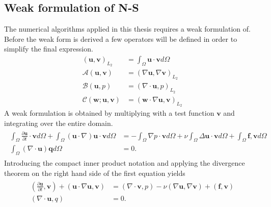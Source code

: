 \subsection{Weak formulation of N-S}
The numerical algorithms applied in this thesis requires a weak formulation of.
Before the weak form is derived a few operators will be defined in order to simplify the final 
expression.
%
\begin{align}
    ( \mathbf{u},\mathbf{v})_{L_2} &= \int_{\Omega}\mathbf{u} \cdot \mathbf{v} d\Omega\\
    \mathcal{A}(\mathbf{u},\mathbf{v}) &= (\nabla \mathbf{u},\nabla \mathbf{v})_{L_2}\\
    \mathcal{B}(\mathbf{u},p) &= (\nabla \cdot \mathbf{u},p)_{L_2}\\
    \mathcal{C}(\mathbf{w};\mathbf{u},\mathbf{v}) &= (\mathbf{w}\cdot \nabla \mathbf{u},\mathbf{v})_{L_2}
    \label{eq:weakoperators}
\end{align}
%
A weak formulation is obtained by multiplying with a test function $\mathbf{v}$ and integrating over
the entire domain.
\begin{align}
    \begin{split}
        \int_{\Omega}\frac{\partial \mathbf{u}}{\partial t}\cdot\mathbf{v}d\Omega
        + \int_{\Omega}(\mathbf{u}\cdot \nabla)\mathbf{u}\cdot\mathbf{v}d\Omega
        &= -\int_{\Omega}\nabla p\cdot \mathbf{v} d\Omega 
        + \nu \int_{\Omega}\Delta\mathbf{u}\cdot\mathbf{v}d\Omega
        + \int_{\Omega}\mathbf{f},\mathbf{v}d\Omega \\
		\int_{\Omega}(\nabla \cdot \mathbf{u}) \mathbf{q}d\Omega &= 0.
    \end{split}
	\label{eq:NSweak1}
\end{align}
Introducing the compact inner product notation and applying the divergence theorem on the right hand side of 
the first equation yields
\begin{align}
    \begin{split}
        (\frac{\partial \mathbf{u}}{\partial t},\mathbf{v})
        + (\mathbf{u}\cdot \nabla\mathbf{u},\mathbf{v})
        &= (\nabla \cdot \mathbf{v} , p ) 
        -\nu(\nabla \mathbf{u},\nabla \mathbf{v})
        + (\mathbf{f},\mathbf{v}) \\
		(\nabla \cdot \mathbf{u},q) &= 0.
    \end{split}
	\label{eq:NSweak}
\end{align}
